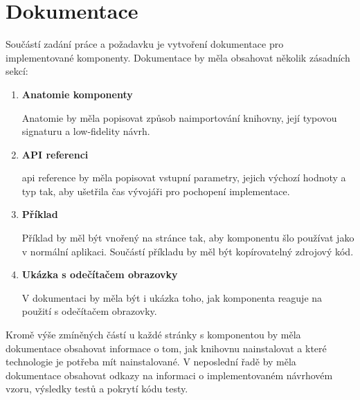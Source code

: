 \clearpage

\section{Dokumentace}

Součástí zadání práce a požadavku \hyperref[nfr14]{} je vytvoření dokumentace pro implementované komponenty.
Dokumentace by měla obsahovat několik zásadních sekcí:

\begin{enumerate}
    \item \textbf{Anatomie komponenty}

          Anatomie by měla popisovat způsob naimportování knihovny, její typovou signaturu a low-fidelity návrh.

    \item \textbf{API referenci}

          \gls{api} reference by měla popisovat vstupní parametry, jejich výchozí hodnoty a typ tak, aby ušetřila čas vývojáři pro pochopení implementace.

    \item \textbf{Příklad}

          Příklad by měl být vnořený na stránce tak, aby komponentu šlo používat jako v normální aplikaci. Součástí příkladu by měl být kopírovatelný zdrojový kód.

    \item \textbf{Ukázka s odečítačem obrazovky}

          V dokumentaci by měla být i ukázka toho, jak komponenta reaguje na použití s odečítačem obrazovky.

\end{enumerate}

Kromě výše zmíněných částí u každé stránky s komponentou by měla dokumentace obsahovat informace o tom, jak knihovnu nainstalovat a které technologie je potřeba mít nainstalované.
V neposlední řadě by měla dokumentace obsahovat odkazy na informaci o implementovaném návrhovém vzoru, výsledky testů a pokrytí kódu testy.
